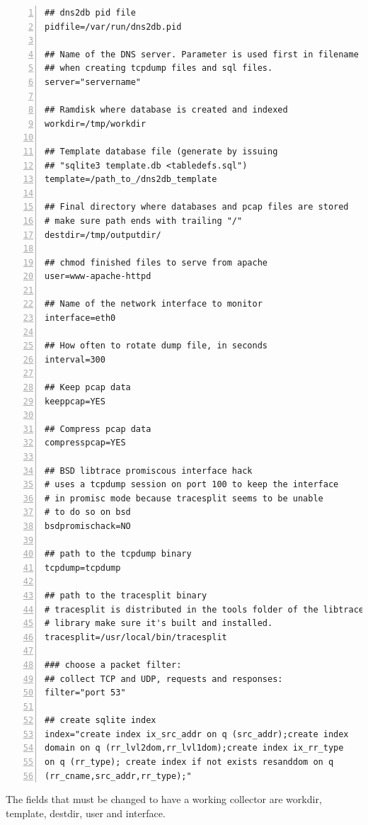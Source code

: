 \documentclass[a4paper]{article}
\begin{document}
\begin{Verbatim}[fontsize=\relsize{-1},numbers=left]
## dns2db pid file
pidfile=/var/run/dns2db.pid

## Name of the DNS server. Parameter is used first in filename 
## when creating tcpdump files and sql files.
server="servername"

## Ramdisk where database is created and indexed
workdir=/tmp/workdir

## Template database file (generate by issuing 
## "sqlite3 template.db <tabledefs.sql")
template=/path_to_/dns2db_template

## Final directory where databases and pcap files are stored
# make sure path ends with trailing "/"
destdir=/tmp/outputdir/

## chmod finished files to serve from apache
user=www-apache-httpd

## Name of the network interface to monitor
interface=eth0

## How often to rotate dump file, in seconds
interval=300

## Keep pcap data
keeppcap=YES

## Compress pcap data
compresspcap=YES

## BSD libtrace promiscous interface hack 
# uses a tcpdump session on port 100 to keep the interface 
# in promisc mode because tracesplit seems to be unable 
# to do so on bsd
bsdpromischack=NO

## path to the tcpdump binary
tcpdump=tcpdump

## path to the tracesplit binary
# tracesplit is distributed in the tools folder of the libtrace 
# library make sure it's built and installed.
tracesplit=/usr/local/bin/tracesplit

### choose a packet filter:
## collect TCP and UDP, requests and responses:
filter="port 53"

## create sqlite index
index="create index ix_src_addr on q (src_addr);create index 
domain on q (rr_lvl2dom,rr_lvl1dom);create index ix_rr_type 
on q (rr_type); create index if not exists resanddom on q 
(rr_cname,src_addr,rr_type);"
\end{Verbatim}

The fields that must be changed to have a working collector 
are workdir, template, destdir, user and interface.
\end{document}
